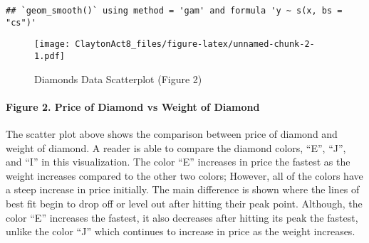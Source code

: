 \documentclass[
]{article}
\begin{document}
\begin{verbatim}
## `geom_smooth()` using method = 'gam' and formula 'y ~ s(x, bs = "cs")'
\end{verbatim}

\begin{figure}
\centering
\texttt{[image: ClaytonAct8\_files/figure-latex/unnamed-chunk-2-1.pdf]}
\caption{Diamonds Data Scatterplot (Figure 2)}
\end{figure}

\hypertarget{figure-2.-price-of-diamond-vs-weight-of-diamond}{%
\paragraph{Figure 2. Price of Diamond vs Weight of
Diamond}\label{figure-2.-price-of-diamond-vs-weight-of-diamond}}

The scatter plot above shows the comparison between price of diamond and
weight of diamond. A reader is able to compare the diamond colors,
``E'', ``J'', and ``I'' in this visualization. The color ``E'' increases
in price the fastest as the weight increases compared to the other two
colors; However, all of the colors have a steep increase in price
initially. The main difference is shown where the lines of best fit
begin to drop off or level out after hitting their peak point. Although,
the color ``E'' increases the fastest, it also decreases after hitting
its peak the fastest, unlike the color ``J'' which continues to increase
in price as the weight increases.
\end{document}
